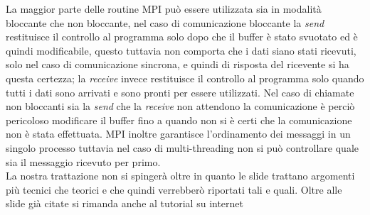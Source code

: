 La maggior parte delle routine MPI può essere utilizzata sia in modalità bloccante che non bloccante, nel caso di comunicazione bloccante la \emph{send} restituisce il controllo al programma solo dopo che il buffer è stato svuotato ed è quindi modificabile, questo tuttavia non comporta che i dati siano stati ricevuti, solo nel caso di comunicazione sincrona, e quindi di risposta del ricevente si ha questa certezza; la \emph{receive} invece restituisce il controllo al programma solo quando tutti i dati sono arrivati e sono pronti per essere utilizzati. Nel caso di chiamate non bloccanti sia la \emph{send} che la \emph{receive} non attendono la comunicazione è perciò pericoloso modificare il buffer fino a quando non si è certi che la comunicazione non è stata effettuata. MPI inoltre garantisce l'ordinamento dei messaggi in un singolo processo tuttavia nel caso di multi-threading non si può controllare quale sia il messaggio ricevuto per primo.\\
La nostra trattazione non si spingerà oltre in quanto le slide \cite{cugola:mpi} trattano argomenti più tecnici che teorici e che quindi verrebberò riportati tali e quali. Oltre alle slide già citate si rimanda anche al tutorial su internet \cite{tutorial:mpi}